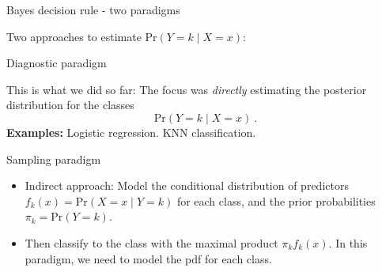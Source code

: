 \documentclass[10pt,ignorenonframetext,]{beamer}
\providecommand{\tightlist}{%
  \setlength{\itemsep}{0pt}\setlength{\parskip}{0pt}}
\begin{document}
\begin{frame}{Bayes decision rule - two paradigms}
\protect\hypertarget{bayes-decision-rule---two-paradigms}{}

\vspace{1mm}

Two approaches to estimate \(\text{Pr}(Y=k \mid X=x)\): \vspace{1mm}

\begin{block}{Diagnostic paradigm}

This is what we did so far: The focus was \emph{directly} estimating the
posterior distribution for the classes \[\text{Pr}(Y=k \mid X=x)\ .\]
\textbf{Examples:} Logistic regression. KNN classification.

\vspace{2mm}

\end{block}

\begin{block}{Sampling paradigm}

\vspace{1mm}

\begin{itemize}
\tightlist
\item
  Indirect approach: Model the conditional distribution of predictors
  \(f_k(x)=\text{Pr}(X=x \mid Y=k)\) for each class, and the prior
  probabilities \(\pi_k=\text{Pr}(Y=k)\).
\end{itemize}

\vspace{1mm}

\begin{itemize}
\tightlist
\item
  Then classify to the class with the maximal product \(\pi_k f_k(x)\).
  In this paradigm, we need to model the pdf for each class.
\end{itemize}

\end{block}

\end{frame}
\end{document}
